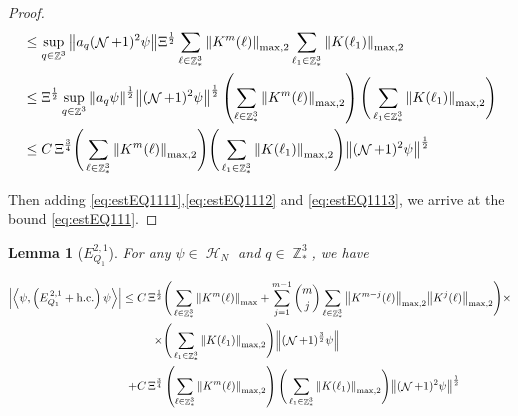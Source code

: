 \documentclass[sn-mathphys, Numbered ,a4paper]{sn-jnl}%
\DeclareMathOperator{\Z}{\mathbb{Z}}
\DeclareMathOperator{\HH}{\mathcal{H}}
\DeclareMathOperator{\NN}{\mathcal{N}}
\newcommand{\half}{\frac{1}{2}}
\newcommand{\eva}[1]{\left\langle #1 \right\rangle}
\theoremstyle{plain}
\newtheorem{lemma}[theorem]{Lemma}
\theoremstyle{definition}
\theoremstyle{remark}
\theoremstyle{plain}
\theoremstyle{definition}
\theoremstyle{remark}
\begin{document}
\begin{proof}
\begin{align}
	&\leq \sup_{q \in \Z^3}\norm{ a_{q} (\NN+1)^2\psi}\Xi^\half\sum\limits_{\ell \in \Z^3_*} \norm{  K^{m}(\ell)}_{\mathrm{max,2}}  \sum\limits_{\ell_1 \in \Z^3_*} \norm{K(\ell_1)}_{\mathrm{max,2}} \nonumber\\
	&\leq  \Xi^\half  \sup_{q \in \Z^3}\norm{ a_{q} \psi}^\half \norm{ (\NN+1)^2\psi}^\half \left(\sum\limits_{\ell \in \Z^3_*} \norm{K^m(\ell)}_{\mathrm{max,2}}\right)\Bigg(\sum\limits_{\ell_1 \in \Z^3_*} \norm{K(\ell_1)}_{\mathrm{max,2}}\Bigg) \nonumber\\
	&\leq C\,\Xi^{\frac{3}{4}} \Bigg(\sum\limits_{\ell \in \Z^3_*} \norm{K^m(\ell)}_{\mathrm{max,2}}\Bigg)\Bigg(\sum\limits_{\ell_1 \in \Z^3_*} \norm{K(\ell_1)}_{\mathrm{max,2}} \Bigg)  \norm{ (\NN+1)^2\psi}^\half \label{eq:estEQ1113}
\end{align}

Then adding \eqref{eq:estEQ1111},\eqref{eq:estEQ1112} and \eqref{eq:estEQ1113}, we arrive at the bound \eqref{eq:estEQ111}.
\end{proof}
\begin{lemma}[$E_{Q_1}^{2,1}$]
For any $\psi \in \HH_N$ and $q \in \Z^3_*$, we have

\begin{alignat}{2}
	\abs{\eva{\psi,\left(E^{\,2,1}_{Q_1}+\mathrm{h.c.}\right) \psi }}\nonumber
	\leq \; &C\, \begin{aligned}[t]\Xi^{\half}\Bigg( &\sum\limits_{\ell \in \Z^3_*} \norm{K^m(\ell)}_{\mathrm{max}} +\sum\limits_{j=1}^{m-1} {{m}\choose{j}} \sum\limits_{\ell \in \Z^3_*} \norm{K^{m-j}(\ell)}_{\mathrm{max,2}} \norm{K^{j}(\ell)}_{\mathrm{max,2}} \Bigg)\times \nonumber\\ \times \Bigg(&\sum\limits_{\ell_1 \in \Z^3_*} \norm{K(\ell_1)}_{\mathrm{max,2}} \Bigg)\norm { (\NN+1)^{\frac{3}{2}} \psi } \nonumber\\
	\end{aligned}\\
	\;+ &C\,\Xi^{\frac{3}{4}} \left(\sum\limits_{\ell \in \Z^3_*} \norm{K^m(\ell)}_{\mathrm{max,2}}\right) \Bigg(\sum\limits_{\ell_1 \in \Z^3_*} \norm{K(\ell_1)}_{\mathrm{max,2}} \Bigg)  \norm{ (\NN+1)^2\psi}^\half\label{eq:estEQ121}
\end{alignat}
\end{lemma}
\end{document}
